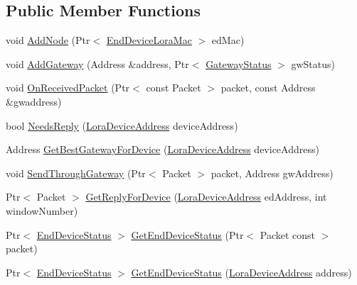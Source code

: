 \subsection*{Public Member Functions}
\begin{DoxyCompactItemize}
\item 
void \hyperlink{classns3_1_1lorawan_1_1NetworkStatus_afa1672e18a2f461795bcc625c62208fd}{Add\+Node} (Ptr$<$ \hyperlink{classns3_1_1lorawan_1_1EndDeviceLoraMac}{End\+Device\+Lora\+Mac} $>$ ed\+Mac)
\item 
void \hyperlink{classns3_1_1lorawan_1_1NetworkStatus_aaf864a8020870ec04cefe03232541dd5}{Add\+Gateway} (Address \&address, Ptr$<$ \hyperlink{classns3_1_1lorawan_1_1GatewayStatus}{Gateway\+Status} $>$ gw\+Status)
\item 
void \hyperlink{classns3_1_1lorawan_1_1NetworkStatus_a3145ab9250630584f436fad43ed1df0d}{On\+Received\+Packet} (Ptr$<$ const Packet $>$ packet, const Address \&gwaddress)
\item 
bool \hyperlink{classns3_1_1lorawan_1_1NetworkStatus_a5175d3ffc372da6af985f7f32eb9b910}{Needs\+Reply} (\hyperlink{classns3_1_1lorawan_1_1LoraDeviceAddress}{Lora\+Device\+Address} device\+Address)
\item 
Address \hyperlink{classns3_1_1lorawan_1_1NetworkStatus_a1febf85e27405aefebab17c2860c3c35}{Get\+Best\+Gateway\+For\+Device} (\hyperlink{classns3_1_1lorawan_1_1LoraDeviceAddress}{Lora\+Device\+Address} device\+Address)
\item 
void \hyperlink{classns3_1_1lorawan_1_1NetworkStatus_a7b7b94a295a6306a6babcc97cd2f5491}{Send\+Through\+Gateway} (Ptr$<$ Packet $>$ packet, Address gw\+Address)
\item 
Ptr$<$ Packet $>$ \hyperlink{classns3_1_1lorawan_1_1NetworkStatus_aea166a6fa4379e993de7e309db64c9d5}{Get\+Reply\+For\+Device} (\hyperlink{classns3_1_1lorawan_1_1LoraDeviceAddress}{Lora\+Device\+Address} ed\+Address, int window\+Number)
\item 
Ptr$<$ \hyperlink{classns3_1_1lorawan_1_1EndDeviceStatus}{End\+Device\+Status} $>$ \hyperlink{classns3_1_1lorawan_1_1NetworkStatus_a83251eb432e1e0c22cbe4a6e2ad9ec52}{Get\+End\+Device\+Status} (Ptr$<$ Packet const $>$ packet)
\item 
Ptr$<$ \hyperlink{classns3_1_1lorawan_1_1EndDeviceStatus}{End\+Device\+Status} $>$ \hyperlink{classns3_1_1lorawan_1_1NetworkStatus_a4f75e1f86d6e90931e71d362222c39b3}{Get\+End\+Device\+Status} (\hyperlink{classns3_1_1lorawan_1_1LoraDeviceAddress}{Lora\+Device\+Address} address)
\end{DoxyCompactItemize}
